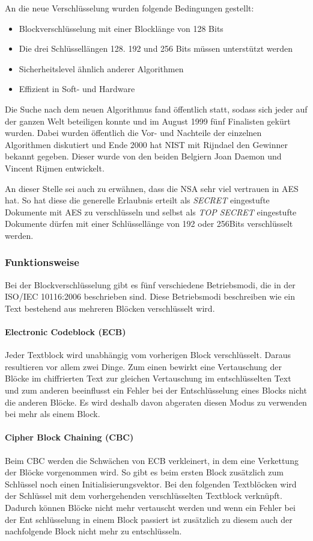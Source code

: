  An die neue Verschlüsselung wurden folgende Bedingungen gestellt:
\begin{itemize}
 \item Blockverschlüsselung mit einer Blocklänge von 128 Bits
 \item Die drei Schlüssellängen 128. 192 und 256 Bits müssen unterstützt werden
 \item Sicherheitslevel ähnlich anderer Algorithmen
 \item Effizient in Soft- und Hardware
\end{itemize} 

Die Suche nach dem neuen Algorithmus fand öffentlich statt, sodass sich jeder auf der ganzen
Welt beteiligen konnte und im August 1999 fünf Finalisten gekürt wurden. Dabei wurden
öffentlich die Vor- und Nachteile der einzelnen Algorithmen diskutiert und Ende 2000 hat NIST
mit Rijndael den Gewinner bekannt gegeben. Dieser wurde von den beiden Belgiern Joan
Daemon und Vincent Rijmen entwickelt.

An dieser Stelle sei auch zu erwähnen, dass die \ac{NSA} sehr viel vertrauen in AES hat. So hat
diese die generelle Erlaubnis erteilt als \emph{SECRET} eingestufte Dokumente mit AES zu
verschlüsseln und selbst als \emph{TOP SECRET} eingestufte Dokumente dürfen mit einer
Schlüssellänge von 192 oder 256Bits verschlüsselt werden. \cite{paar10}
 
 \subsubsection{Funktionsweise}
 \label{aes-funktion}
 Bei der Blockverschlüsselung gibt es fünf verschiedene Betriebsmodi, die in der ISO/IEC 10116:2006
 \cite{ISO10116} beschrieben sind. Diese Betriebsmodi beschreiben wie ein Text bestehend aus
 mehreren Blöcken verschlüsselt wird.
 
  \paragraph{Electronic Codeblock (ECB)}
   Jeder Textblock wird unabhängig vom vorherigen Block verschlüsselt. Daraus resultieren vor allem
   zwei Dinge. Zum einen bewirkt eine Vertauschung der Blöcke im chiffrierten Text zur gleichen Vertauschung
   im entschlüsselten Text und zum anderen beeinflusst ein Fehler bei der Entschlüsselung eines Blocks
   nicht die anderen Blöcke. Es wird deshalb davon abgeraten diesen Modus zu verwenden bei mehr
   als einem Block.

  \paragraph{Cipher Block Chaining (CBC)}
   Beim CBC werden die Schwächen von ECB verkleinert, in dem eine Verkettung der Blöcke vorgenommen
   wird. So gibt es beim ersten Block zusätzlich zum Schlüssel noch einen Initialisierungsvektor. Bei den
   folgenden Textblöcken wird der Schlüssel mit dem vorhergehenden verschlüsselten Textblock
   verknüpft. Dadurch können Blöcke nicht mehr vertauscht werden und wenn ein Fehler bei der Ent\-
   schlüsselung in einem Block passiert ist zusätzlich zu diesem auch der nachfolgende Block nicht mehr
   zu entschlüsseln.
   
